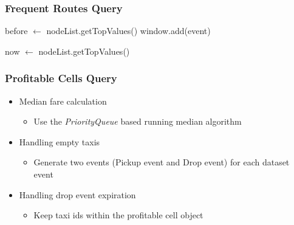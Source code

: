 \documentclass{beamer}
\begin{document}
\begin{frame}
\frametitle{Frequent Routes Query}

\begin{algorithm}[H]
\footnotesize
before $\gets$ nodeList.getTopValues()\;
window.add(event)\;


now $\gets$ nodeList.getTopValues()\;


\end{algorithm}


\end{frame}

\begin{frame}
\frametitle{Profitable Cells Query}
\begin{itemize}
        \item Median fare calculation
		\begin{itemize}
			\item Use the \textit{PriorityQueue} based running median algorithm
		\end{itemize}
        \item Handling empty taxis
		\begin{itemize}
                        \item Generate two events (Pickup event and Drop event) for each dataset event
                \end{itemize}
        \item Handling drop event expiration
		\begin{itemize}
                        \item Keep taxi ids within the profitable cell object
                \end{itemize}
\end{itemize}

\end{frame}
\end{document}
